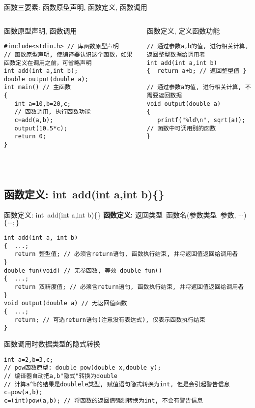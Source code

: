 \begin{frame}{函数三要素: 函数原型声明, 函数定义, 函数调用}
\begin{columns}[T]
\begin{beamerboxesrounded}{函数原型声明, 函数调用}
\begin{lstlisting}
#include<stdio.h> // 库函数原型声明
// 函数原型声明, 使编译器认识这个函数，如果函数定义在调用之前，可省略声明
int add(int a,int b); 
double output(double a);
int main() // 主函数
{
   int a=10,b=20,c;
   // 函数调用, 执行函数功能
   c=add(a,b); 
   output(10.5*c);
   return 0; 
}
\end{lstlisting}
\end{beamerboxesrounded}
\begin{beamerboxesrounded}{函数定义, 定义函数功能}
\begin{lstlisting}
// 通过参数a,b的值, 进行相关计算, 返回整型数据给调用者
int add(int a,int b)
{  return a+b; // 返回整型值 }

// 通过参数a的值, 进行相关计算, 不需要返回数据
void output(double a)
{  
   printf("%ld\n", sqrt(a)); // 函数中可调用别的函数
}
\end{lstlisting}
\end{beamerboxesrounded}
\end{columns}
~\\
\end{frame}

\subsection{函数定义: int\, add(int a,int b)\{\quad\}}

\begin{frame}{函数定义: int\, add(int a,int b)\{\quad\}}
\textbf{函数定义: } 返回类型\, 函数名(参数类型\, 参数, $\cdots$) $\{\cdots ; \}$
\begin{lstlisting}
int add(int a, int b)
{  ...;
   return 整型值; // 必须含return语句, 函数执行结束, 并将返回值返回给调用者
}
double fun(void) // 无参函数, 等效 double fun() 
{  ...;
   return 双精度值; // 必须含return语句, 函数执行结束, 并将返回值返回给调用者
}
void output(double a) // 无返回值函数
{  ...;
   return; // 可选return语句(注意没有表达式), 仅表示函数执行结束
}
\end{lstlisting}
\end{frame}

\begin{frame}{函数调用时数据类型的隐式转换}
\begin{lstlisting}
int a=2,b=3,c;
// pow函数原型: double pow(double x,double y);
// 编译器自动把a,b"隐式"转换为double
// 计算a^b的结果是doublele类型, 赋值语句隐式转换为int, 但是会引起警告信息
c=pow(a,b);
c=(int)pow(a,b); // 将函数的返回值强制转换为int, 不会有警告信息
\end{lstlisting}
\end{frame}

